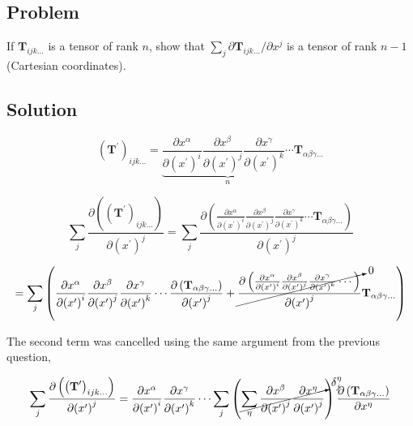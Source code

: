 \documentclass[12pt]{article}
\begin{document}
\subsection{Problem}

If \(\textbf{T}_{ijk\ldots}\) is a tensor of rank \(n\), show that
\(\sum_j \partial \textbf{T}_{ijk\ldots}/\partial x^j\) is a tensor of rank \(n - 1\)
(Cartesian coordinates).

\subsection{Solution}

\[
    {\left(\textbf{T}^\prime\right)}_{ijk \ldots}
    = \underbrace{
        \frac{\partial x^\alpha}{\partial {\left(x^\prime\right)}^i}
        \frac{\partial x^\beta}{\partial {\left(x^\prime\right)}^j}
        \frac{\partial x^\gamma}{\partial {\left(x^\prime\right)}^k}
        \cdots
    }_n
    \textbf{T}_{\alpha \beta \gamma \ldots}
\]

\[
    \sum_j
    \frac
    {\partial \left({\left(\textbf{T}^\prime\right)}_{ijk \ldots}\right)}
    {\partial {\left(x^\prime\right)}^j}
    = \sum_j
    \frac
    {\partial \left(
        \frac{\partial x^\alpha}{\partial {\left(x^\prime\right)}^i}
        \frac{\partial x^\beta}{\partial {\left(x^\prime\right)}^j}
        \frac{\partial x^\gamma}{\partial {\left(x^\prime\right)}^k}
        \cdots
        \textbf{T}_{\alpha \beta \gamma \ldots}\right)}
    {\partial {\left(x^\prime\right)}^j}
\]

\[
    = \sum_j
    \left(
    \frac{\partial x^\alpha}{\partial {\left(x^\prime\right)}^i}
    \frac{\partial x^\beta}{\partial {\left(x^\prime\right)}^j}
    \frac{\partial x^\gamma}{\partial {\left(x^\prime\right)}^k}
    \cdots \frac
    {\partial \left(\textbf{T}_{\alpha \beta \gamma \ldots}\right)}
    {\partial {\left(x^\prime\right)}^j}
    + \cancelto{0}{\frac{\partial
            \left(
            \frac{\partial x^\alpha}{\partial {\left(x^\prime\right)}^i}
            \frac{\partial x^\beta}{\partial {\left(x^\prime\right)}^j}
            \frac{\partial x^\gamma}{\partial {\left(x^\prime\right)}^k}
            \cdots
            \right)}
        {\partial {\left(x^\prime\right)}^j}}
    \textbf{T}_{\alpha \beta \gamma \ldots}
    \right)
\]

The second term was cancelled using the same argument from the previous question,

\[
    \sum_j
    \frac
    {\partial \left({\left(\textbf{T}^\prime\right)}_{ijk \ldots}\right)}
    {\partial {\left(x^\prime\right)}^j}
    = \frac{\partial x^\alpha}{\partial {\left(x^\prime\right)}^i}
    \frac{\partial x^\gamma}{\partial {\left(x^\prime\right)}^k}
    \cdots
    \sum_j
    \left(\cancelto{\delta^\eta_j}{\sum_\eta
        \frac{\partial x^\beta}{\partial {\left(x^\prime\right)}^j}
        \frac{\partial x^\eta}{\partial {\left(x^\prime\right)}^j}}\right)
    \frac
    {\partial \left(\textbf{T}_{\alpha \beta \gamma \ldots}\right)}
    {\partial x^\eta}
\]
\end{document}
